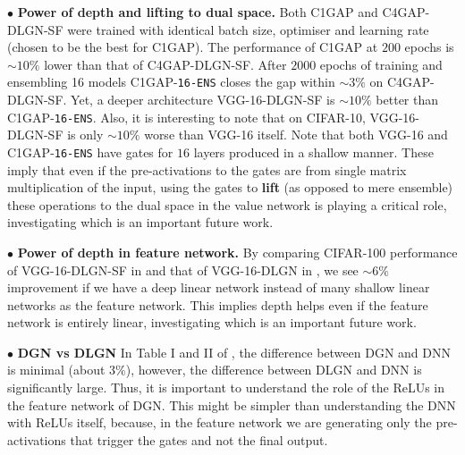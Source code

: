 $\bullet$ \textbf{Power of depth and lifting to dual space.} Both C1GAP and C4GAP-DLGN-SF were trained with identical batch size, optimiser and learning rate (chosen to be the best for C1GAP). The performance of C1GAP at $200$ epochs is $\sim10\%$ lower than that of C4GAP-DLGN-SF. After $2000$ epochs of training and ensembling 16 models C1GAP-\texttt{16-ENS} closes the gap within $\sim 3\%$ on C4GAP-DLGN-SF. Yet, a deeper architecture VGG-16-DLGN-SF is $\sim10\%$ better than C1GAP-\texttt{16-ENS}. Also, it is interesting to note that on CIFAR-10,  VGG-16-DLGN-SF is only $\sim10\%$ worse than VGG-16 itself. Note that both VGG-16 and C1GAP-\texttt{16-ENS} have gates for $16$ layers produced in a shallow manner. These imply that even if the pre-activations to the gates are from single matrix multiplication of the input, using the gates to \textbf{lift} (as opposed to mere ensemble) these operations to the dual space in the value network is playing a critical role, investigating which is an important future work.%

$\bullet$ \textbf{Power of depth in feature network.} By comparing CIFAR-100 performance of VGG-16-DLGN-SF in  and that of VGG-16-DLGN in , we see $\sim 6\%$ improvement if we have a deep linear network instead of many shallow linear networks as the feature network. This implies depth helps even if the feature network is entirely linear, investigating which is an important future work. 

$\bullet$ \textbf{DGN vs DLGN} In Table I and II of , the difference between DGN and DNN is minimal (about $3\%$), however, the difference between DLGN and DNN is significantly large. Thus, it is important to understand the role of the ReLUs in the feature network of DGN. This might be simpler than understanding the DNN with ReLUs itself, because, in the feature network we are generating only the pre-activations that trigger the gates and not the final output. 


